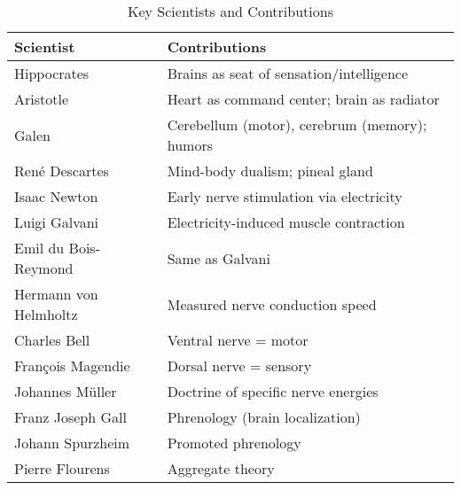 \begin{landscape}
    \pagestyle{plain}
    \vfill
    \begin{table}[h]
        \centering
        \caption{Key Scientists and Contributions}
        \label{tab:neuroscientists}
        \begin{tabular}{p{5.2cm}p{9.5cm}}
            \toprule
            \textbf{Scientist}    & \textbf{Contributions}                              \\
            \midrule
            Hippocrates           & Brains as seat of sensation/intelligence                                   \\
            Aristotle             & Heart as command center; brain as radiator                                 \\
            Galen                 & Cerebellum (motor), cerebrum (memory); humors                              \\
            René Descartes        & Mind-body dualism; pineal gland                                            \\
            Isaac Newton          & Early nerve stimulation via electricity                                    \\
            Luigi Galvani         & Electricity-induced muscle contraction                                     \\
            Emil du Bois-Reymond  & Same as Galvani                                                            \\
            Hermann von Helmholtz & Measured nerve conduction speed                                            \\
            Charles Bell          & Ventral nerve = motor                                                      \\
            François Magendie     & Dorsal nerve = sensory                                                     \\
            Johannes Müller       & Doctrine of specific nerve energies                                        \\
            Franz Joseph Gall     & Phrenology (brain localization)                                            \\
            Johann Spurzheim      & Promoted phrenology                                                        \\
            Pierre Flourens       & Aggregate theory                                                           \\

\end{tabular}
\end{table}
\end{landscape}
